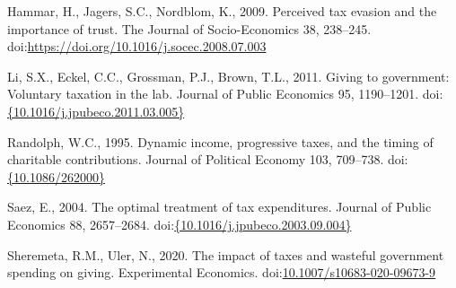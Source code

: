 \documentclass[ review  , 3p ]{elsarticle}
\begin{document}
  \leavevmode\hypertarget{ref-Hammar2009}{}%
  Hammar, H., Jagers, S.C., Nordblom, K., 2009. Perceived tax evasion and the importance of trust. The Journal of Socio-Economics 38, 238--245. doi:\href{https://doi.org/https://doi.org/10.1016/j.socec.2008.07.003}{https://doi.org/10.1016/j.socec.2008.07.003}
  
  \leavevmode\hypertarget{ref-Li2011}{}%
  Li, S.X., Eckel, C.C., Grossman, P.J., Brown, T.L., 2011. Giving to government: Voluntary taxation in the lab. Journal of Public Economics 95, 1190--1201. doi:\href{https://doi.org/\%7B10.1016/j.jpubeco.2011.03.005\%7D}{\{10.1016/j.jpubeco.2011.03.005\}}
  
  \leavevmode\hypertarget{ref-Randolph1995}{}%
  Randolph, W.C., 1995. Dynamic income, progressive taxes, and the timing of charitable contributions. Journal of Political Economy 103, 709--738. doi:\href{https://doi.org/\%7B10.1086/262000\%7D}{\{10.1086/262000\}}
  
  \leavevmode\hypertarget{ref-Saez2004}{}%
  Saez, E., 2004. The optimal treatment of tax expenditures. Journal of Public Economics 88, 2657--2684. doi:\href{https://doi.org/\%7B10.1016/j.jpubeco.2003.09.004\%7D}{\{10.1016/j.jpubeco.2003.09.004\}}
  
  \leavevmode\hypertarget{ref-Sheremeta2020}{}%
  Sheremeta, R.M., Uler, N., 2020. The impact of taxes and wasteful government spending on giving. Experimental Economics. doi:\href{https://doi.org/10.1007/s10683-020-09673-9}{10.1007/s10683-020-09673-9}
\end{document}
